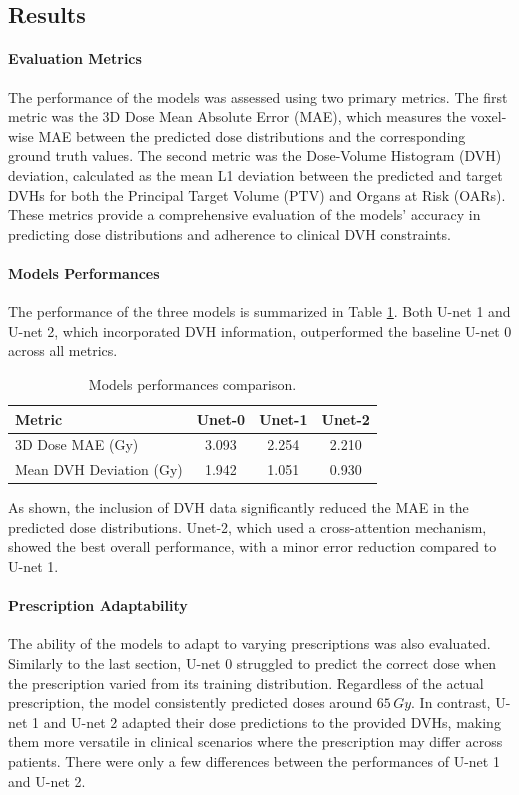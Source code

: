 \subsection{Results}
\paragraph{Evaluation Metrics}  
The performance of the models was assessed using two primary metrics.
The first metric was the 3D Dose Mean Absolute Error (MAE), which measures the voxel-wise MAE between the predicted dose distributions and the corresponding ground truth values.
The second metric was the Dose-Volume Histogram (DVH) deviation, calculated as the mean L1 deviation between the predicted and target DVHs for both the Principal Target Volume (PTV) and Organs at Risk (OARs).
These metrics provide a comprehensive evaluation of the models' accuracy in predicting dose distributions and adherence to clinical DVH constraints.

\paragraph{Models Performances}
The performance of the three models is summarized in Table \ref{tab:model_performance}.
Both U-net 1 and U-net 2, which incorporated DVH information, outperformed the baseline U-net 0 across all metrics.

\begin{table}
	\centering
	\begin{tabular}{|l|c|c|c|}
		\hline
		\textbf{Metric}         & \textbf{Unet-0} & \textbf{Unet-1} & \textbf{Unet-2} \\
		\hline
		3D Dose MAE (Gy)        & 3.093           & 2.254           & 2.210           \\
		\hline
		Mean DVH Deviation (Gy) & 1.942           & 1.051           & 0.930           \\
		\hline
	\end{tabular}
	\caption{Models performances comparison.}
	\label{tab:model_performance}
\end{table}

As shown, the inclusion of DVH data significantly reduced the MAE in the predicted dose distributions.
Unet-2, which used a cross-attention mechanism, showed the best overall performance, with a minor error reduction compared to U-net 1.

\paragraph{Prescription Adaptability}
The ability of the models to adapt to varying prescriptions was also evaluated.
Similarly to the last section, U-net 0 struggled to predict the correct dose when the prescription varied from its training distribution.
Regardless of the actual prescription, the model consistently predicted doses around $65\,\textit{Gy}$.
In contrast, U-net 1 and U-net 2 adapted their dose predictions to the provided DVHs, making them more versatile in clinical scenarios where the prescription may differ across patients.
There were only a few differences between the performances of U-net 1 and U-net 2.

